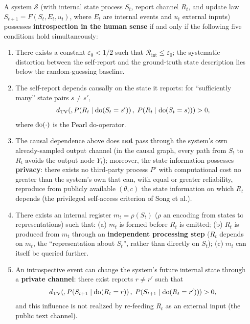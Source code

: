 \begin{definition}\label{def:criterion}
A system $\mathcal{S}$ (with internal state process $S_t$, report channel $R_t$, and update
law $S_{t+1} = F(S_t, E_t, u_t)$, where $E_t$ are internal events and $u_t$ external inputs)
possesses \textbf{introspection in the human sense} if and only if the following five
conditions hold simultaneously:

\begin{enumerate}[align=left, labelwidth=!, labelsep=0.8em, leftmargin=!, itemindent=0pt]
\item[($\mathrm{A}_1$)\textbf{Accuracy}] There exists a constant $\varepsilon_0 < 1/2$ such
that $\mathcal{R}_{\mathrm{int}} \le \varepsilon_0$; the systematic distortion between
the self-report and the ground-truth state description lies below the random-guessing
baseline.
\item[($\mathrm{A}_2$)\textbf{Grounding}] The self-report depends causally on the state it
reports: for ``sufficiently many'' state pairs $s \ne s'$,
\begin{equation}
d_{\mathrm{TV}}\!\left(,P\!\left(R_t \mid \operatorname{do}(S_t = s')\right),\; P\!\left(R_t \mid \operatorname{do}(S_t = s)\right)\right) > 0,
\label{eq:grounding}
\end{equation}
where $\operatorname{do}(\cdot)$ is the Pearl do-operator\cite{pearl-2009}.
\item[($\mathrm{A}_3$)\textbf{Internality and privileged access}] The causal dependence above
does \textbf{not} pass through the system's own already-sampled output channel (in the causal
graph, every path from $S_t$ to $R_t$ avoids the output node $Y_t$); moreover, the state
information possesses \textbf{privacy}: there exists no third-party process $P'$ with
computational cost no greater than the system's own that can, with equal or greater
reliability, reproduce from publicly available $(\theta, c)$ the state information on which
$R_t$ depends (the privileged self-access criterion of Song et
al.\cite{song-privileged-2025}).
\item[($\mathrm{A}_4$)\textbf{Metacognitive representation}] There exists an internal register
$m_t = \rho(S_t)$ ($\rho$ an encoding from states to representations) such that:
(a) $m_t$ is formed before $R_t$ is emitted; (b) $R_t$ is produced from $m_t$ through an
\textbf{independent processing step} ($R_t$ depends on $m_t$, the ``representation about
$S_t$'', rather than directly on $S_t$); (c) $m_t$ can itself be queried further.
\item[($\mathrm{A}_5$)\textbf{Closed-loop plasticity}] An introspective event can change the
system's future internal state through a \textbf{private channel}: there exist reports
$r \ne r'$ such that
\begin{equation}
d_{\mathrm{TV}}\!\left(,P\!\left(S_{t+1} \mid \operatorname{do}(R_t = r)\right),\; P\!\left(S_{t+1} \mid \operatorname{do}(R_t = r')\right)\right) > 0,
\label{eq:closedloop}
\end{equation}
and this influence is not realized by re-feeding $R_t$ as an external input (the public text
channel).
\end{enumerate}
\end{definition}

